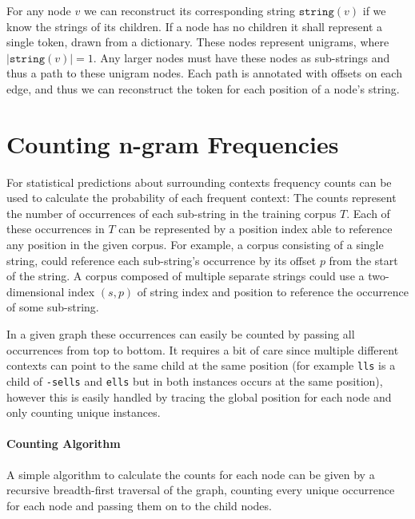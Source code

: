 For any node $v$ we can reconstruct its corresponding string $\texttt{string}(v)$ if we know the strings of its children. If a node has no children it shall represent a single token, drawn from a dictionary. These nodes represent unigrams, where $|\texttt{string}(v)| = 1$. Any larger nodes must have these nodes as sub-strings and thus a path to these unigram nodes. Each path is annotated with offsets on each edge, and thus we can reconstruct the token for each position of a node's string.

\section{Counting n-gram Frequencies}

For statistical predictions about surrounding contexts frequency counts can be used to calculate the probability of each frequent context:
The counts represent the number of occurrences of each sub-string in the training corpus $T$. Each of these occurrences in $T$ can be represented by a position index able to reference any position in the given corpus. For example, a corpus consisting of a single string, could reference each sub-string's occurrence by its offset $p$ from the start of the string. A corpus composed of multiple separate strings could use a two-dimensional index $(s, p)$ of string index and position to reference the occurrence of some sub-string.

In a given graph these occurrences can easily be counted by passing all occurrences from top to bottom. It requires a bit of care since multiple different contexts can point to the same child at the same position (for example \texttt{lls} is a child of \texttt{-sells} and \texttt{ells} but in both instances occurs at the same position), however this is easily handled by tracing the global position for each node and only counting unique instances.

\paragraph{Counting Algorithm}
A simple algorithm to calculate the counts for each node can be given by a recursive breadth-first traversal of the graph, counting every unique occurrence for each node and passing them on to the child nodes.

